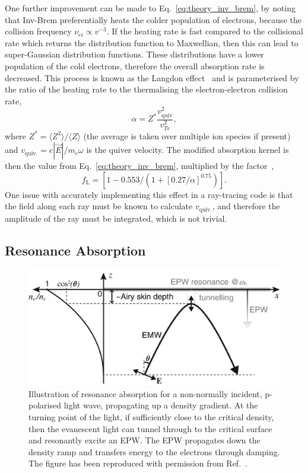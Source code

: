 One further improvement can be made to Eq.~\ref{eq:theory_inv_brem}, by noting that \ac{Inv-Brem} preferentially heats the colder population of electrons, because the collision frequency $\nu_{ei}\propto v^{-3}$.
If the heating rate is fast compared to the collisional rate which returns the distribution function to Maxwellian, then this can lead to super-Gaussian distribution functions.
These distributions have a lower population of the cold electrons, therefore the overall absorption rate is decreased.
This process is known as the Langdon effect~\cite{langdon_nonlinear_1980} and is parameterised by the ratio of the heating rate to the thermalising the electron-electron collision rate,
\begin{equation}
    \label{eq:theory_alpha_langdon}
    \alpha = Z^* \frac{v_{\text{quiv}}^2}{v_{Te}^2},
\end{equation}
where $Z^* = \langle Z^2 \rangle / \langle Z \rangle $ (the average is taken over multiple ion species if present) and $v_{\text{quiv.}} = e|\vec{E}|/m_e \omega$ is the quiver velocity.
The modified absorption kernel is then the value from Eq.~\ref{eq:theory_inv_brem}, multiplied by the factor~\cite{colaitis_inverse_2021},
\begin{equation}
    f_{\text{L}} = \left[ 1 - 0.553/\left( 1 + {[0.27/\alpha]}^{0.75} \right) \right].
\end{equation}
One issue with accurately implementing this effect in a ray-tracing code is that the field along each ray must be known to calculate $v_{\text{quiv.}}$, and therefore the amplitude of the ray must be integrated, which is not trivial.

\subsection{Resonance Absorption}%
\label{sec:theory_res_abs}

\begin{figure}[t!]
    \includegraphics[width=0.65\linewidth]{Theory/Images/Res_Abs.png}
    \centering
    \caption{Illustration of resonance absorption for a non-normally incident, p-polarised light wave, propagating up a density gradient.
    At the turning point of the light, if sufficiently close to the critical density, then the evanescent light can tunnel through to the critical surface and resonantly excite an \ac{EPW}.
    The \ac{EPW} propagates down the density ramp and transfers energy to the electrons through damping.
    The figure has been reproduced with permission from Ref.~\cite{michel_introduction_2023}.}%
    \label{fig:theory_res_abs}
\end{figure}

